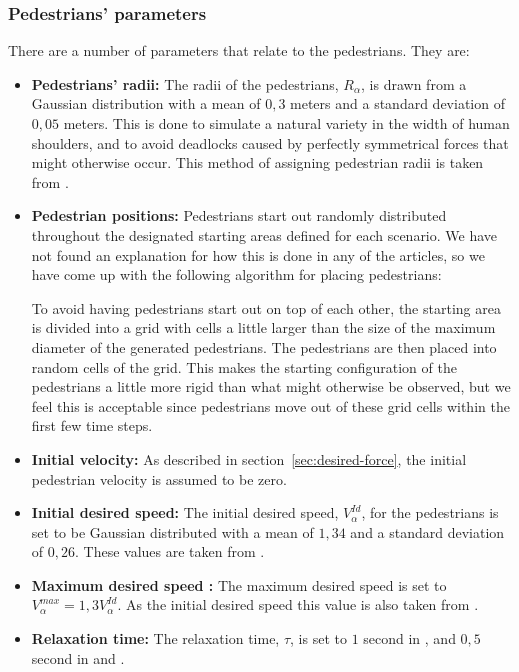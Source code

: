 \subsubsection{Pedestrians' parameters}
\label{sec:init-pedestrians}
There are a number of parameters that relate to the pedestrians. They are:

\begin{itemize}
    \item \textbf{Pedestrians' radii:} The radii of the pedestrians, 
        $R_\alpha$, is drawn from a Gaussian distribution with a mean of $0,3$ 
        meters and a standard deviation of $0,05$ meters. This is done to 
        simulate a natural variety in the width of human shoulders, and to 
        avoid deadlocks caused by perfectly symmetrical forces that might 
        otherwise occur. This method of assigning pedestrian radii is taken 
        from \cite{helbing00}.
        
    \item \textbf{Pedestrian positions:} Pedestrians start out randomly 
        distributed throughout the designated starting areas defined for each 
        scenario. We have not found an explanation for how this is done in any 
        of the articles, so we have come up with the following algorithm for 
        placing pedestrians:

        To avoid having pedestrians start out on top of each other, the 
        starting area is divided into a grid with cells a little larger than 
        the size of the maximum diameter of the generated pedestrians. The 
        pedestrians are then placed into random cells of the grid. This makes 
        the starting configuration of the pedestrians a little more rigid than 
        what might otherwise be observed, but we feel this is acceptable since 
        pedestrians move out of these grid cells within the first few time 
        steps.
        
    \item \textbf{Initial velocity:} As described in 
        section~\ref{sec:desired-force}, the initial pedestrian velocity is 
        assumed to be zero.


    \item \textbf{Initial desired speed:} The initial desired speed, 
        $V^{Id}_\alpha$, for the pedestrians is set to be Gaussian 
        distributed with a mean of $1,34$ and a standard deviation of $0,26$.
	These values are taken from \cite{social-force}. 


    \item \textbf{Maximum desired speed :} The maximum desired speed is set to 
        $V_{\alpha}^{max}=1,3V^{Id}_\alpha$.
	As the initial desired speed this value is also taken from \cite{social-force}.
      
        
    \item \textbf{Relaxation time:} The relaxation time, $\tau$, is set to $1$ 
        second in \cite{self-org}, and $0,5$ second in \cite{social-force} and \cite{helbing00}. 
\end{itemize}

